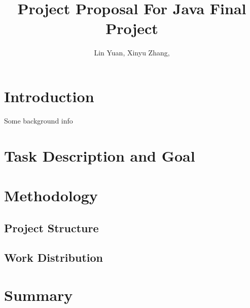 \documentclass[dvips,12pt]{article}
\title{Project Proposal For Java Final Project}
\author{Lin Yuan, Xinyu Zhang, }
\begin{document}
\maketitle
\section{Introduction}
Some background info
\section{Task Description and Goal}
\section{Methodology}
\subsection{Project Structure}
\subsection{Work Distribution}
\subsection{}
\section{Summary}


\end{document}
